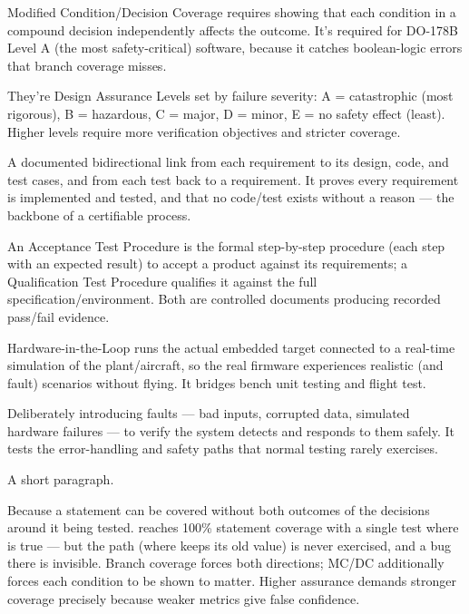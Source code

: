 Modified Condition/Decision Coverage requires showing that each condition in a
compound decision independently affects the outcome. It's required for DO-178B
Level A (the most safety-critical) software, because it catches boolean-logic
errors that branch coverage misses.

They're Design Assurance Levels set by failure severity: A = catastrophic
(most rigorous), B = hazardous, C = major, D = minor, E = no safety effect
(least). Higher levels require more verification objectives and stricter
coverage.

A documented bidirectional link from each requirement to its design, code, and
test cases, and from each test back to a requirement. It proves every
requirement is implemented and tested, and that no code/test exists without a
reason --- the backbone of a certifiable process.

An Acceptance Test Procedure is the formal step-by-step procedure (each step with
an expected result) to accept a product against its requirements; a Qualification
Test Procedure qualifies it against the full specification/environment.
Both are controlled documents producing recorded pass/fail evidence.

Hardware-in-the-Loop runs the actual embedded target connected to a real-time
simulation of the plant/aircraft, so the real firmware experiences realistic
(and fault) scenarios without flying. It bridges bench unit testing and flight
test.

Deliberately introducing faults --- bad inputs, corrupted data, simulated
hardware failures --- to verify the system detects and responds to them safely.
It tests the error-handling and safety paths that normal testing rarely
exercises.

%
{A short paragraph.}

Because a statement can be covered without both outcomes of the decisions around
it being tested.  reaches 100\% statement coverage with a
single test where  is true --- but the  path (where
 keeps its old value) is never exercised, and a bug there is invisible.
Branch coverage forces both directions; MC/DC additionally forces each condition
to be shown to matter. Higher assurance demands stronger coverage precisely
because weaker metrics give false confidence.

